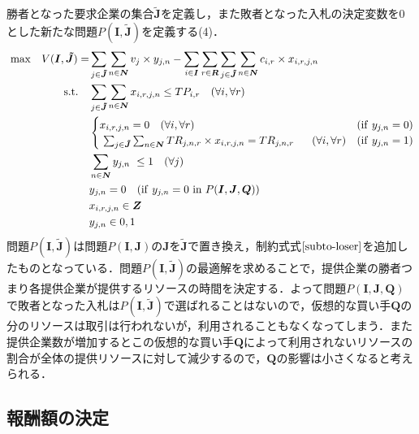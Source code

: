 勝者となった要求企業の集合\(\boldsymbol{\tilde{J}}\)を定義し，また敗者となった入札の決定変数を0とした新たな問題\(P(\boldsymbol{I},\boldsymbol{\tilde{J}})\)を定義する(4)．
\begin{align}  
{\rm max}\quad V(\boldsymbol{I},\boldsymbol{\tilde{J}})=&\sum_{j\in \boldsymbol{\tilde{J}}}\sum_{n\in\boldsymbol{N}}v_{j} \times y_{j,n} - \sum_{i\in\boldsymbol{I}}\sum_{r\in\boldsymbol{R}}\sum_{j\in\boldsymbol{\tilde{J}}}\sum_{n\in\boldsymbol{N}}c_{i,r} \times x_{i,r,j,n}\\  
{\rm s.t.} \quad &\sum_{j\in \boldsymbol{\tilde{J}}}\sum_{n\in\boldsymbol{N}}x_{i,r,j,n} \leq TP_{i,r} \quad (\forall i, \forall r)\\
&\begin{cases} x_{i,r,j,n} = 0 \quad (\forall i, \forall r)&({\rm if} \ y_{j,n}=0) \\  
\sum_{j \in \boldsymbol{\tilde{J}}}\sum_{n\in\boldsymbol{N}} TR_{j,n,r} \times x_{i,r,j,n} = TR_{j,n,r}    \quad  (\forall i, \forall r)&({\rm if} \ y_{j,n}=1) \end{cases}\\ 
&\sum_{n\in \boldsymbol{N}}y_{j,n}  \leq 1 \quad (\forall j)\\  
&y_{j,n}=0 \quad ({\rm if} \ y_{j,n}=0 \ {\rm in}  \ P(\boldsymbol{I},\boldsymbol{J},\boldsymbol{Q}))\label{subto-loser}\\
&x_{i,r,j,n} \in \boldsymbol{Z}\\    
&y_{j,n} \in {0,1}
\end{align}
問題\(P(\boldsymbol{I},\boldsymbol{\tilde{J}})\)は問題\(P(\boldsymbol{I},\boldsymbol{J})\)の\(\boldsymbol{J}\)を\(\boldsymbol{\tilde{J}}\)で置き換え，制約式式\(\eqref{subto-loser}\)を追加したものとなっている．問題\(P(\boldsymbol{I},\boldsymbol{\tilde{J}})\)の最適解を求めることで，提供企業の勝者つまり各提供企業が提供するリソースの時間を決定する．よって問題\(P(\boldsymbol{I},\boldsymbol{J},\boldsymbol{Q})\)で敗者となった入札は\(P(\boldsymbol{I},\boldsymbol{\tilde{J}})\)で選ばれることはないので，仮想的な買い手\(\boldsymbol{Q}\)の分のリソースは取引は行われないが，利用されることもなくなってしまう．また提供企業数が増加するとこの仮想的な買い手\(\boldsymbol{Q}\)によって利用されないリソースの割合が全体の提供リソースに対して減少するので，\(\boldsymbol{Q}\)の影響は小さくなると考えられる．

\hypertarget{ux5831ux916cux984dux306eux6c7aux5b9a}{%
\subsection{\texorpdfstring{報酬額の決定\label{sec:m2-reward}}{報酬額の決定}}\label{ux5831ux916cux984dux306eux6c7aux5b9a}}

